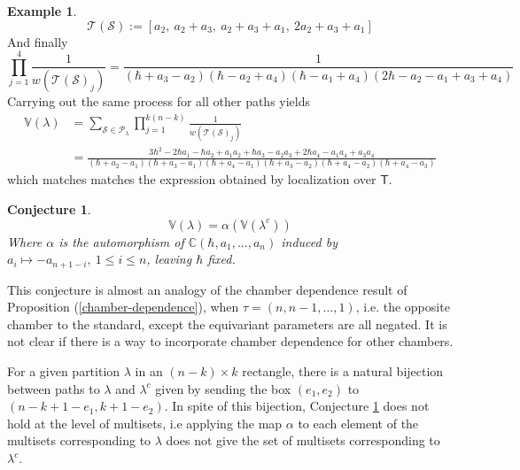 \documentclass[12 pt]{article}
\theoremstyle{plain}
\theoremstyle{plain}
\theoremstyle{plain}
\theoremstyle{plain}
\theoremstyle{plain}
\theoremstyle{plain}
\theoremstyle{plain}
\theoremstyle{plain}
\theoremstyle{plain}
\newtheorem{conjecture}[theorem]{Conjecture}
\theoremstyle{plain}
\theoremstyle{remark}
\theoremstyle{remark}
\theoremstyle{definition}
\theoremstyle{definition}
\theoremstyle{definition}
\newtheorem{example}{Example}[section]
\theoremstyle{definition}
\theoremstyle{definition}
\theoremstyle{definition}
\newcommand{\bT}{\mathsf{T}}
\begin{document}
\begin{example}
    \[\mathcal{T}(\mathcal{S}):=[a_{2},\ a_{2} + a_{3},\ a_{2} + a_{3} + a_{1},\ 2a_{2} + a_{3} + a_{1}]\]
    And finally
    \[\prod\limits_{j=1}^{4}\frac{1}{w(\mathcal{T}(\mathcal{S})_{j})}=\frac{1}{(\hbar + a_{3} - a_{2})(\hbar - a_{2} + a_{4})(\hbar - a_{1} + a_{4})(2\hbar - a_{2} - a_{1} + a_{3} + a_{4})}\]
Carrying out the same process for all other paths yields
    \begin{align*}\mathbb{V}(\lambda)&=\sum\limits_{\mathcal{S}\in\mathcal{P}_{\lambda}}\prod\limits_{j=1}^{k(n-k)}\frac{1}{w(\mathcal{T}(\mathcal{S})_{j})}\\
    &=\frac{3\hbar^{2}-2\hbar a_{1}-\hbar a_{2}+a_{1}a_{2}+\hbar a_{3}-a_{2}a_{3}+2\hbar a_{4}-a_{1}a_{4}+a_{3}a_{4}}{(\hbar+a_{2}-a_{1})(\hbar+a_{3}-a_{1})(\hbar+a_{4}-a_{1})(\hbar+a_{3}-a_{2})(\hbar+a_{4}-a_{2})(\hbar+a_{4}-a_{3})}
    \end{align*}
    which matches matches the expression obtained by localization over $\bT$. 
\end{example}

\begin{conjecture}\label{var-complement}
    \[
    \mathbb{V}(\lambda)=\alpha(\mathbb{V}(\lambda^{c}))
    \]
    Where $\alpha$ is the automorphism of $\mathbb{C}(\hbar,a_{1},\dots,a_{n})$ induced by $a_{i}\mapsto -a_{n+1-i},\ 1\leq i\leq n$, leaving $\hbar$ fixed.
\end{conjecture}

This conjecture is almost an analogy of the chamber dependence result of Proposition (\ref{chamber-dependence}), when $\tau=(n,n-1,\dots,1)$, i.e. the opposite chamber to the standard, except the equivariant parameters are all negated. It is not clear if there is a way to incorporate chamber dependence for other chambers.

For a given partition $\lambda$ in an $(n-k)\times k$ rectangle, there is a natural bijection between paths to $\lambda$ and $\lambda^{c}$ given by sending the box $(e_{1},e_{2})$ to $(n-k+1-e_{1},k+1-e_{2})$. In spite of this bijection, Conjecture \ref{var-complement} does not hold at the level of multisets, i.e applying the map $\alpha$ to each element of the multisets corresponding to $\lambda$ does not give the set of multisets corresponding to $\lambda^{c}$.
\end{document}
